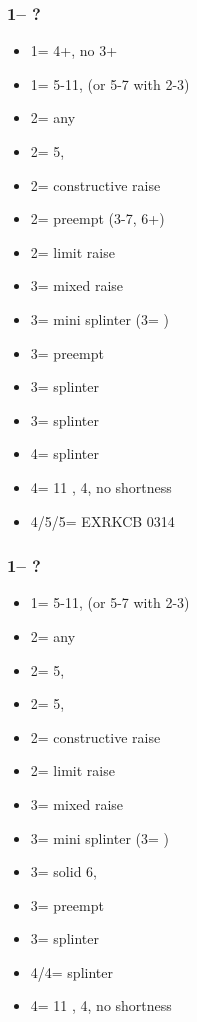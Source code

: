 \subsubsection*{1\hearts -- ?}
\begin{itemize}
    \item 1\spades = 4+\spades, no 3\hearts {}\hearts + \gf
    \item 1\nt = 5-11, (or 5-7 with 2-3\hearts)
    \item 2\clubs = any \gf
    \item 2\diams = 5\diams, \gf
    \item 2\hearts = constructive raise
    \item 2\spades = \spades preempt (3-7, 6+\spades)
    \item 2\nt = limit raise
    \item 3\clubs = mixed raise
    \item 3\diams = mini splinter (3\hearts = \lsf)
    \item 3\hearts = preempt
    \item 3\spades = splinter \spades
    \item 3\nt = splinter \diams
    \item 4\clubs = splinter \clubs
    \item 4\diams = 11 \hcp, 4\hearts, no shortness
    \item 4\spades/5\clubs/5\diams = EXRKCB 0314
\end{itemize}

\subsubsection*{1\spades -- ?}
\begin{itemize}
    \item 1\nt = 5-11, (or 5-7 with 2-3\spades)
    \item 2\clubs = any \gf
    \item 2\diams = 5\diams, \gf
    \item 2\hearts = 5\hearts, \gf
    \item 2\spades = constructive raise
    \item 2\nt = limit raise
    \item 3\clubs = mixed raise
    \item 3\diams = mini splinter (3\hearts = \lsf)
    \item 3\hearts = solid 6\hearts, \inv
    \item 3\spades = preempt
    \item 3\nt = splinter \hearts
    \item 4\clubs/4\diams = splinter
    \item 4\hearts = 11 \hcp, 4\spades, no shortness
\end{itemize}

